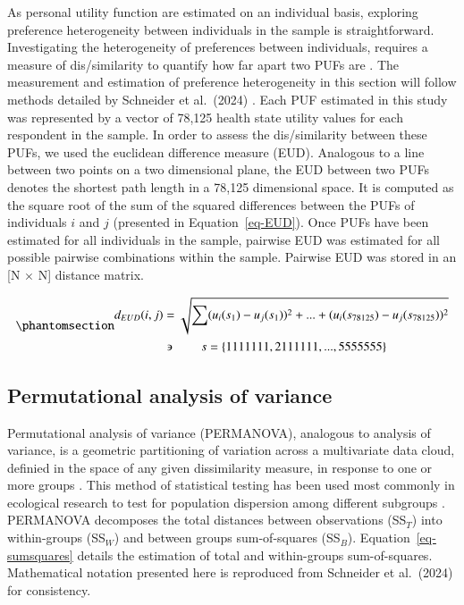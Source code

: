 \documentclass[
  number,
  preprint]{elsarticle}
\begin{document}
As personal utility function are estimated on an individual basis,
exploring preference heterogeneity between individuals in the sample is
straightforward. Investigating the heterogeneity of preferences between
individuals, requires a measure of dis/similarity to quantify how far
apart two PUFs are \citep{Schneider2024ExploringLevel}. The measurement
and estimation of preference heterogeneity in this section will follow
methods detailed by Schneider et al.~(2024)
\citep{Schneider2024ExploringLevel}. Each PUF estimated in this study
was represented by a vector of 78,125 health state utility values for
each respondent in the sample. In order to assess the dis/similarity
between these PUFs, we used the euclidean difference measure (EUD).
Analogous to a line between two points on a two dimensional plane, the
EUD between two PUFs denotes the shortest path length in a 78,125
dimensional space. It is computed as the square root of the sum of the
squared differences between the PUFs of individuals \(i\) and \(j\)
(presented in Equation~\ref{eq-EUD}). Once PUFs have been estimated for
all individuals in the sample, pairwise EUD was estimated for all
possible pairwise combinations within the sample. Pairwise EUD was
stored in an {[}N \(\times\) N{]} distance matrix.

\begin{equation}\phantomsection\label{eq-EUD}{ 
  \begin{aligned}
    d_{EUD}(i,j) & =\sqrt{\sum_{}^{}(u_{i}(s_{1})-u_{j}(s_{1}))^{2}+ ... +(u_{i}(s_{78125})-u_{j}(s_{78125}))^{2}}\\
      & \backepsilon \quad \quad s = \{1111111, 2111111, ..., 5555555\}\\
  \end{aligned}
}\end{equation}

\subsection{Permutational analysis of
variance}\label{permutational-analysis-of-variance}

Permutational analysis of variance (PERMANOVA), analogous to analysis of
variance, is a geometric partitioning of variation across a multivariate
data cloud, definied in the space of any given dissimilarity measure, in
response to one or more groups
\citep{Anderson2017, Anderson2013PERMANOVATesting}. This method of
statistical testing has been used most commonly in ecological research
to test for population dispersion among different subgroups
\citep{Souza2013PopulationEstuary}. PERMANOVA decomposes the total
distances between observations (SS\(_T\)) into within-groups (SS\(_W\))
and between groups sum-of-squares (SS\(_B\)).
Equation~\ref{eq-sumsquares} details the estimation of total and
within-groups sum-of-squares. Mathematical notation presented here is
reproduced from Schneider et al.~(2024)
\citep{Schneider2024ExploringLevel} for consistency.
\end{document}
